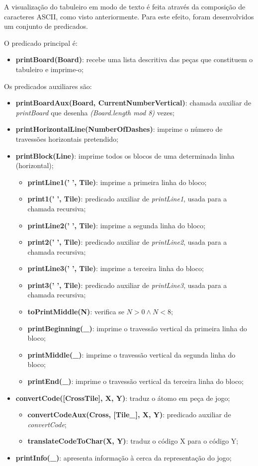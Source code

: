 \documentclass[a4paper]{article}
\begin{document}
A visualização do tabuleiro em modo de texto é feita através da composição de caracteres ASCII, como visto anteriormente. Para este efeito, foram desenvolvidos um conjunto de predicados. 

O predicado principal é:
\begin{itemize}
	\item \textbf{printBoard(Board)}: recebe uma lista descritiva das peças que constituem o tabuleiro e imprime-o;
\end{itemize}

Os predicados auxiliares são:
\begin{itemize}
	
	\item \textbf{printBoardAux(Board, CurrentNumberVertical)}: chamada auxiliar de \textit{printBoard} que desenha \textit{(Board.length mod 8)} vezes;	
	\item \textbf{printHorizontalLine(NumberOfDashes)}: imprime o número de travessões horizontais pretendido;
	\item \textbf{printBlock(Line)}: imprime todos os blocos de uma determinada linha (horizontal);
	\begin{itemize}
		\item \textbf{printLine1(' ', Tile)}: imprime a primeira linha do bloco;
		\item \textbf{print1(' ', Tile)}: predicado auxiliar de \textit{printLine1}, usada para a chamada recursiva;
		\item \textbf{printLine2(' ', Tile)}: imprime a segunda linha do bloco;
		\item \textbf{print2(' ', Tile)}: predicado auxiliar de \textit{printLine2}, usada para a chamada recursiva;
		\item \textbf{printLine3(' ', Tile)}: imprime a terceira linha do bloco;
		\item \textbf{print3(' ', Tile)}: predicado auxiliar de \textit{printLine3}, usada para a chamada recursiva;
		\item \textbf{toPrintMiddle(N)}: verifica se 
		\begin{math}
			N>0 \wedge N<8;
		\end{math}
		\item \textbf{printBeginning(\_)}: imprime o travessão vertical da primeira linha do bloco;
		\item \textbf{printMiddle(\_)}: imprime o travessão vertical da segunda linha do bloco;
		\item \textbf{printEnd(\_)}: imprime o travessão vertical da terceira linha do bloco;
	\end{itemize}
	\item \textbf{convertCode([Cross\textbar Tile], X, Y)}: traduz o átomo em peça de jogo;
	\begin{itemize}
		\item \textbf{convertCodeAux(Cross, [Tile\textbar \_], X, Y)}: predicado auxiliar de \textit{convertCode};
		\item \textbf{translateCodeToChar(X, Y)}: traduz o código X para o código Y;
	\end{itemize}
	\item \textbf{printInfo(\_)}: apresenta informação à cerca da representação do jogo;
	

\end{itemize}
\end{document}
